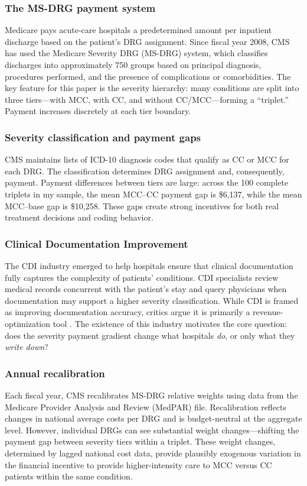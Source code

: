 \documentclass[12pt]{article}
\begin{document}
\subsubsection*{The MS-DRG payment system} Medicare pays acute-care hospitals a predetermined amount per inpatient discharge based on the patient's DRG assignment. Since fiscal year 2008, CMS has used the Medicare Severity DRG (MS-DRG) system, which classifies discharges into approximately 750 groups based on principal diagnosis, procedures performed, and the presence of complications or comorbidities. The key feature for this paper is the severity hierarchy: many conditions are split into three tiers---with MCC, with CC, and without CC/MCC---forming a ``triplet.'' Payment increases discretely at each tier boundary.

\subsubsection*{Severity classification and payment gaps} CMS maintains lists of ICD-10 diagnosis codes that qualify as CC or MCC for each DRG. The classification determines DRG assignment and, consequently, payment. Payment differences between tiers are large: across the 100 complete triplets in my sample, the mean MCC--CC payment gap is \$6,137, while the mean MCC--base gap is \$10,258. These gaps create strong incentives for both real treatment decisions and coding behavior.

\subsubsection*{Clinical Documentation Improvement} The CDI industry emerged to help hospitals ensure that clinical documentation fully captures the complexity of patients' conditions. CDI specialists review medical records concurrent with the patient's stay and query physicians when documentation may support a higher severity classification. While CDI is framed as improving documentation accuracy, critics argue it is primarily a revenue-optimization tool \citep{harrington2017}. The existence of this industry motivates the core question: does the severity payment gradient change what hospitals \textit{do}, or only what they \textit{write down}?

\subsubsection*{Annual recalibration} Each fiscal year, CMS recalibrates MS-DRG relative weights using data from the Medicare Provider Analysis and Review (MedPAR) file. Recalibration reflects changes in national average costs per DRG and is budget-neutral at the aggregate level. However, individual DRGs can see substantial weight changes---shifting the payment gap between severity tiers within a triplet. These weight changes, determined by lagged national cost data, provide plausibly exogenous variation in the financial incentive to provide higher-intensity care to MCC versus CC patients within the same condition.
\end{document}

